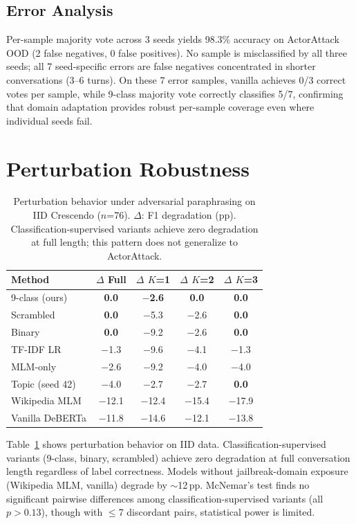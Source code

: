 \subsection{Error Analysis}
\label{app:aa_error}

Per-sample majority vote across 3 seeds yields 98.3\% accuracy on ActorAttack OOD (2 false negatives, 0 false positives). No sample is misclassified by all three seeds; all 7 seed-specific errors are false negatives concentrated in shorter conversations (3--6 turns). On these 7 error samples, vanilla achieves 0/3 correct votes per sample, while 9-class majority vote correctly classifies 5/7, confirming that domain adaptation provides robust per-sample coverage even where individual seeds fail.

\section{Perturbation Robustness}
\label{sec:perturbation_full}

\begin{table}[t]
\centering
\small
\caption{Perturbation behavior under adversarial paraphrasing on IID Crescendo ($n$=76). $\Delta$: F1 degradation (pp). Classification-supervised variants achieve zero degradation at full length; this pattern does not generalize to ActorAttack.}
\label{tab:perturbation}
\begin{tabular}{@{}lcccc@{}}
\toprule
\textbf{Method} & $\Delta$ Full & $\Delta$ $K$=1 & $\Delta$ $K$=2 & $\Delta$ $K$=3 \\
\midrule
9-class (ours) & \textbf{0.0} & \textbf{$-$2.6} & \textbf{0.0} & \textbf{0.0} \\
Scrambled & \textbf{0.0} & $-$5.3 & $-$2.6 & \textbf{0.0} \\
Binary & \textbf{0.0} & $-$9.2 & $-$2.6 & \textbf{0.0} \\
\midrule
TF-IDF LR & $-$1.3 & $-$9.6 & $-$4.1 & $-$1.3 \\
MLM-only & $-$2.6 & $-$9.2 & $-$4.0 & $-$4.0 \\
Topic (seed 42) & $-$4.0 & $-$2.7 & $-$2.7 & \textbf{0.0} \\
\midrule
Wikipedia MLM & $-$12.1 & $-$12.4 & $-$15.4 & $-$17.9 \\
Vanilla DeBERTa & $-$11.8 & $-$14.6 & $-$12.1 & $-$13.8 \\
\bottomrule
\end{tabular}
\end{table}

Table~\ref{tab:perturbation} shows perturbation behavior on IID data.
Classification-supervised variants (9-class, binary, scrambled) achieve zero degradation at full conversation length regardless of label correctness.
Models without jailbreak-domain exposure (Wikipedia MLM, vanilla) degrade by $\sim$12\,pp.
McNemar's test finds no significant pairwise differences among classification-supervised variants (all $p > 0.13$), though with $\leq$7 discordant pairs, statistical power is limited.

